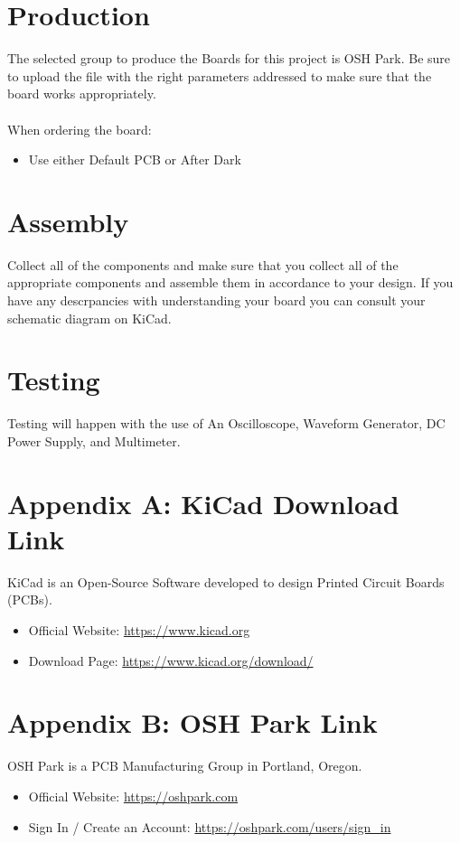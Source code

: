 \documentclass[12pt, letterpaper]{article}
\begin{document}
\section{Production}
The selected group to produce the Boards for this project is OSH Park. Be sure to upload the file with the right parameters addressed to make sure that the board works appropriately.\\
\\
When ordering the board:

\begin{itemize}
    \item Use either Default PCB or After Dark
\end{itemize}

\section{Assembly}
Collect all of the components and make sure that you collect all of the appropriate components and assemble them in accordance to your design. If you have any descrpancies with understanding your board you can consult your schematic diagram on KiCad.

\section{Testing}
Testing will happen with the use of An Oscilloscope, Waveform Generator, DC Power Supply, and Multimeter.

\section{Appendix A: KiCad Download Link}
KiCad is an Open-Source Software developed to design Printed Circuit Boards (PCBs).

\begin{itemize}
    \item Official Website: \url{https://www.kicad.org}
    \item Download Page: \url{https://www.kicad.org/download/}
\end{itemize}

\section{Appendix B: OSH Park Link}
OSH Park is a PCB Manufacturing Group in Portland, Oregon.

\begin{itemize}
    \item Official Website: \url{https://oshpark.com}
    \item Sign In / Create an Account: \url{https://oshpark.com/users/sign_in}
\end{itemize}
\end{document}
